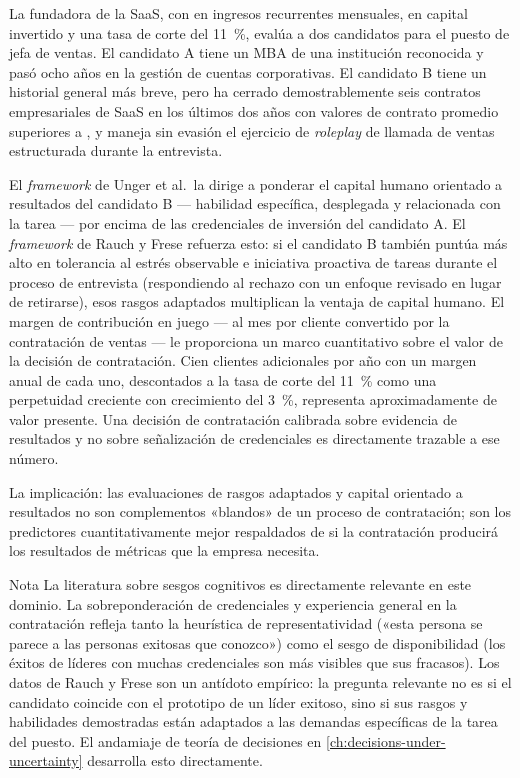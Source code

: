 \begin{example}
La fundadora de la SaaS, con  en ingresos recurrentes mensuales, 
en capital invertido y una tasa de corte del \qty{11}{\percent}, evalúa a dos candidatos para el
puesto de jefa de ventas. El candidato A tiene un MBA de una institución reconocida y pasó ocho
años en la gestión de cuentas corporativas. El candidato B tiene un historial general más breve,
pero ha cerrado demostrablemente seis contratos empresariales de SaaS en los últimos dos años
con valores de contrato promedio superiores a , y maneja sin evasión el ejercicio
de \emph{roleplay} de llamada de ventas estructurada durante la entrevista.

El \emph{framework} de Unger et al.\ la dirige a ponderar el capital humano orientado a
resultados del candidato B --- habilidad específica, desplegada y relacionada con la tarea ---
por encima de las credenciales de inversión del candidato A. El \emph{framework} de Rauch y
Frese refuerza esto: si el candidato B también puntúa más alto en tolerancia al estrés
observable e iniciativa proactiva de tareas durante el proceso de entrevista (respondiendo al
rechazo con un enfoque revisado en lugar de retirarse), esos rasgos adaptados multiplican la
ventaja de capital humano. El margen de contribución en juego ---  al mes por cliente
convertido por la contratación de ventas --- le proporciona un marco cuantitativo sobre el valor
de la decisión de contratación. Cien clientes adicionales por año con un margen anual de
 cada uno, descontados a la tasa de corte del \qty{11}{\percent} como una perpetuidad
creciente con crecimiento del \qty{3}{\percent}, representa aproximadamente  de
valor presente. Una decisión de contratación calibrada sobre evidencia de resultados y no sobre
señalización de credenciales es directamente trazable a ese número.

La implicación: las evaluaciones de rasgos adaptados y capital orientado a resultados no son
complementos «blandos» de un proceso de contratación; son los predictores cuantitativamente
mejor respaldados de si la contratación producirá los resultados de métricas que la empresa
necesita.
\end{example}

\begin{admonition}{Nota}
La literatura sobre sesgos cognitivos es directamente relevante en este dominio. La
sobreponderación de credenciales y experiencia general en la contratación refleja tanto la
heurística de representatividad («esta persona se parece a las personas exitosas que conozco»)
como el sesgo de disponibilidad (los éxitos de líderes con muchas credenciales son más visibles
que sus fracasos). Los datos de Rauch y Frese son un antídoto empírico: la pregunta relevante
no es si el candidato coincide con el prototipo de un líder exitoso, sino si sus rasgos y
habilidades demostradas están adaptados a las demandas específicas de la tarea del puesto. El
andamiaje de teoría de decisiones en \cref{ch:decisions-under-uncertainty} desarrolla esto
directamente.
\end{admonition}


